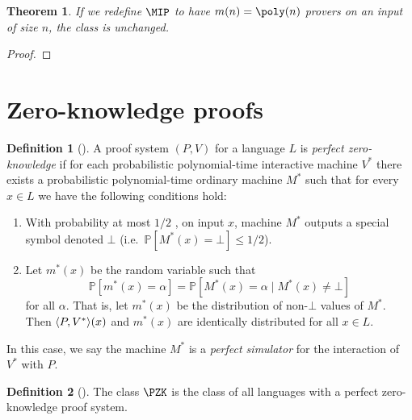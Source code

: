 \documentclass[english]{reedthesis}
\theoremstyle{plain}
\newtheorem{thm}{Theorem}[section]
\theoremstyle{definition}
\newtheorem{defn}[defn]{Definition}
\theoremstyle{remark}
\DeclarePairedDelimiter{\ang}{\langle}{\rangle}
\begin{document}
\begin{thm}\label{thm:mip-unchanged}
  If we redefine $\MIP$ to have $m(n) = \poly(n)$ provers on an input of size
  $n$, the class is unchanged.
\end{thm}

\begin{proof}
\end{proof}

\section{Zero-knowledge proofs}\label{sec:zero-knowledge}

\begin{defn}[{\cite[Def.\ 4.3.1]{Go01}}]\label{def:zero-knowledge}
  A proof system $(P, V)$ for a language $L$ is \emph{perfect zero-knowledge} if
  for each probabilistic polynomial-time interactive machine $V^{*}$ there
  exists a probabilistic polynomial-time ordinary machine $M^{*}$ such that for
  every $x \in L$ we have the following conditions hold:
  \begin{enumerate}
    \item With probability at most $1/2$ , on input $x$, machine $M^{*}$ outputs
          a special symbol denoted $\bot$ (i.e.\ $\mathbb{P}[M^{*}(x) = \bot] \le 1/2$).
    \item Let $m^{*}(x)$ be the random variable such that
          \begin{equation}
            \mathbb{P}[m^{*}(x) = \alpha] = \mathbb{P}[M^{*}(x) = \alpha \mid M^{*}(x) \ne \bot]
          \end{equation}
          for all $\alpha$. That is, let $m^{*}(x)$ be the distribution of non-$\bot$
          values of $M^{*}$. Then $\ang{P, V^{*}}(x)$ and $m^{*}(x)$ are
          identically distributed for all $x \in L$.
  \end{enumerate}
  In this case, we say the machine $M^{*}$ is a \emph{perfect simulator} for the
  interaction of $V^{*}$ with $P$.
\end{defn}


\begin{defn}[{\cite[Def.\ 4.3.5]{Go01}}]\label{def:pzk}
  The class $\PZK$ is the class of all languages with a perfect zero-knowledge
  proof system.
\end{defn}
\end{document}
